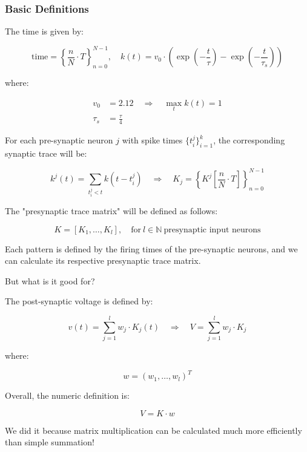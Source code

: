 \subsubsection{Basic Definitions}

The time is given by:

\begin{equation}
    \text{time} = \left\{\frac{n}{N} \cdot T\right\}_{n=0}^{N-1}, \quad k(t) = v_0 \cdot \left(\exp\left(-\frac{t}{\tau}\right) - \exp\left(-\frac{t}{\tau_s}\right)\right)
\end{equation}

where:

\begin{align*}
    v_0 &= 2.12 \quad \Rightarrow \quad \max_t k(t) = 1 \\
    \tau_s &= \frac{\tau}{4}
\end{align*}

For each pre-synaptic neuron $j$ with spike times $\{t_i^j\}_{i=1}^k$, the corresponding synaptic trace will be:

\begin{equation}
    k^j(t) = \sum_{t_i^j < t} k(t - t_i^j) \quad \Rightarrow \quad K_j = \left\{K^j\left[\frac{n}{N} \cdot T\right]\right\}_{n=0}^{N-1}
\end{equation}

The "presynaptic trace matrix" will be defined as follows:

\begin{equation}
    K = [K_1, \dots, K_l], \quad \text{for} \ l \in \mathbb{N} \ \text{presynaptic input neurons}
\end{equation}

Each pattern is defined by the firing times of the pre-synaptic neurons, and we can calculate its respective presynaptic trace matrix.

But what is it good for?

The post-synaptic voltage is defined by:

\begin{equation}
    v(t) = \sum_{j=1}^l w_j \cdot K_j(t) \quad \Rightarrow \quad V = \sum_{j=1}^l w_j \cdot K_j
\end{equation}

where:

\begin{equation}
    w = (w_1, \dots, w_l)^T
\end{equation}

Overall, the numeric definition is:

\begin{equation}
    V = K \cdot w
\end{equation}

We did it because matrix multiplication can be calculated much more efficiently than simple summation!
